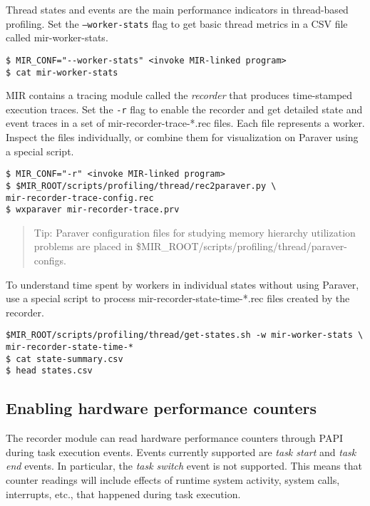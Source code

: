 \documentclass[11pt,a4paper]{article}
\begin{document}
Thread states and events are the main performance indicators in thread-based profiling.
Set the \texttt{--worker-stats} flag to get basic thread metrics in a CSV file called \textsf{mir-worker-stats}.

\begin{lstlisting}[style=MyInputStyle]
$ MIR_CONF="--worker-stats" <invoke MIR-linked program>
$ cat mir-worker-stats
\end{lstlisting}

MIR contains a tracing module called the \textit{recorder} that produces time-stamped execution traces. Set the \texttt{-r} flag to enable the recorder and get detailed state and event traces in a set of \textsf{mir-recorder-trace-*.rec} files.  Each file represents a worker. Inspect the files individually, or combine them for visualization on Paraver using a special script.

\begin{lstlisting}[style=MyInputStyle]
$ MIR_CONF="-r" <invoke MIR-linked program>
$ $MIR_ROOT/scripts/profiling/thread/rec2paraver.py \
mir-recorder-trace-config.rec
$ wxparaver mir-recorder-trace.prv
\end{lstlisting}

\begin{framed}
\begin{quote}
Tip: Paraver configuration files for studying memory hierarchy utilization problems are placed in \textsf{\$MIR\_ROOT/scripts/profiling/thread/paraver-configs}.
\end{quote}
\end{framed}

To understand time spent by workers in individual states without using Paraver, use a special script to process \textsf{mir-recorder-state-time-*.rec} files created by the recorder.

\begin{lstlisting}[style=MyInputStyle]
$MIR_ROOT/scripts/profiling/thread/get-states.sh -w mir-worker-stats \
mir-recorder-state-time-*
$ cat state-summary.csv
$ head states.csv
\end{lstlisting}

\subsection{Enabling hardware performance counters}\label{sec:enabling-hardware-performance-counters}

The recorder module can read hardware performance counters through PAPI during task execution events. Events currently supported are \textit{task start} and \textit{task end} events.
In particular, the \textit{task switch} event is not supported.
This means that counter readings will include effects of runtime system activity, system calls, interrupts, etc., that happened during task execution.
\end{document}
